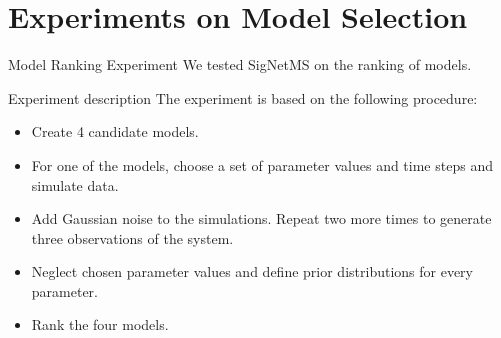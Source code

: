 \documentclass{beamer}
\begin{document}
\section{Experiments on Model Selection}
\begin{frame}{Model Ranking Experiment}
We tested SigNetMS on the ranking of models.
\end{frame}


\begin{frame}{Experiment description}
The experiment is based on the following procedure:
\begin{itemize}
    \pause
    \item{Create 4 candidate models.}
    \pause
    \item{For one of the models, choose a set of parameter values 
        and time steps and simulate data.}
    \pause
    \item{Add Gaussian noise to the simulations. Repeat two more 
        times to generate three observations of the system.}
    \pause
    \item{Neglect chosen parameter values and define prior distributions
        for every parameter.}
    \pause
    \item{Rank the four models.}
\end{itemize}
\end{frame}
\end{document}
